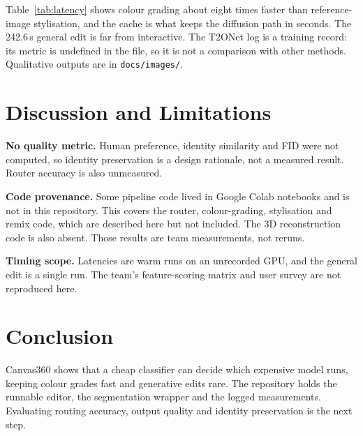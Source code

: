 \documentclass[10pt,twocolumn,a4paper]{article}
\begin{document}
Table~\ref{tab:latency} shows colour grading about eight times faster than reference-image stylisation, and the cache is what keeps the diffusion path in seconds. The 242.6\,s general edit is far from interactive. The T2ONet log is a training record: its metric is undefined in the file, so it is not a comparison with other methods. Qualitative outputs are in \texttt{docs/images/}.

\section{Discussion and Limitations}
\textbf{No quality metric.} Human preference, identity similarity and FID were not computed, so identity preservation is a design rationale, not a measured result. Router accuracy is also unmeasured.

\textbf{Code provenance.} Some pipeline code lived in Google Colab notebooks and is not in this repository. This covers the router, colour-grading, stylisation and remix code, which are described here but not included. The 3D reconstruction code is also absent. Those results are team measurements, not reruns.

\textbf{Timing scope.} Latencies are warm runs on an unrecorded GPU, and the general edit is a single run. The team's feature-scoring matrix and user survey are not reproduced here.

\section{Conclusion}
Canvas360 shows that a cheap classifier can decide which expensive model runs, keeping colour grades fast and generative edits rare. The repository holds the runnable editor, the segmentation wrapper and the logged measurements. Evaluating routing accuracy, output quality and identity preservation is the next step.


\footnotesize

\end{document}
